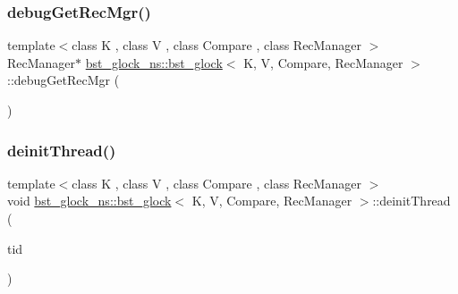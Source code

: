 \subsubsection{\texorpdfstring{debug\+Get\+Rec\+Mgr()}{debugGetRecMgr()}}
{\footnotesize\ttfamily template$<$class K , class V , class Compare , class Rec\+Manager $>$ \\
Rec\+Manager$\ast$ \hyperlink{classbst__glock__ns_1_1bst__glock}{bst\+\_\+glock\+\_\+ns\+::bst\+\_\+glock}$<$ K, V, Compare, Rec\+Manager $>$\+::debug\+Get\+Rec\+Mgr (\begin{DoxyParamCaption}{ }\end{DoxyParamCaption})\hspace{0.3cm}{\ttfamily [inline]}}

\mbox{\label{classbst__glock__ns_1_1bst__glock_a48520520abec6693b6a36e1d3740893a}} 
\subsubsection{\texorpdfstring{deinit\+Thread()}{deinitThread()}}
{\footnotesize\ttfamily template$<$class K , class V , class Compare , class Rec\+Manager $>$ \\
void \hyperlink{classbst__glock__ns_1_1bst__glock}{bst\+\_\+glock\+\_\+ns\+::bst\+\_\+glock}$<$ K, V, Compare, Rec\+Manager $>$\+::deinit\+Thread (\begin{DoxyParamCaption}\item[{const int}]{tid }\end{DoxyParamCaption})\hspace{0.3cm}{\ttfamily [inline]}}

\mbox{\label{classbst__glock__ns_1_1bst__glock_ad0d18633925cb4ae141c5dc52d2035c5}} 
